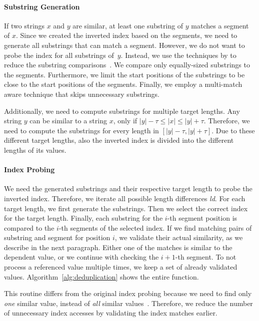 \paragraph{Substring Generation}
If two strings $x$ and $y$ are similar, at least one substring of $y$ matches a segment of $x$.
Since we created the inverted index based on the segments, we need to generate all substrings that can match a segment.
However, we do not want to probe the index for all substrings of~$y$.
Instead, we use the techniques by \citeauthor{PassJoin} to reduce the substring comparisons~\cite{PassJoin}.
We compare only equally-sized substrings to the segments.
Furthermore, we limit the start positions of the substrings to be close to the start positions of the segments.
Finally, we employ a multi-match aware technique that skips unnecessary substrings.

Additionally, we need to compute substrings for multiple target lengths.
Any string $y$ can be similar to a string $x$, only if $|y| - \tau \leq |x| \leq |y| + \tau$.
Therefore, we need to compute the substrings for every length in $[|y| - \tau, |y| + \tau]$.
Due to these different target lengths, also the inverted index is divided into the different lengths of its values.


\paragraph{Index Probing}
We need the generated substrings and their respective target length to probe the inverted index.
Therefore, we iterate all possible length differences \textit{ld}.
For each target length, we first generate the substrings.
Then we select the correct index for the target length.
Finally, each substring for the $i$-th segment position is compared to the $i$-th segments of the selected index.
If we find matching pairs of substring and segment for position $i$, we validate their actual similarity, as we describe in the next paragraph.
Either one of the matches is similar to the dependent value, or we continue with checking the $i+1$-th segment.
To not process a referenced value multiple times, we keep a set of already validated values.
Algorithm~\ref{alg:deduplication} shows the entire function.

This routine differs from the original  index probing because we need to find only \emph{one} similar value, instead of \emph{all} similar values~\cite{PassJoin}.
Therefore, we reduce the number of unnecessary index accesses by validating the index matches earlier.


